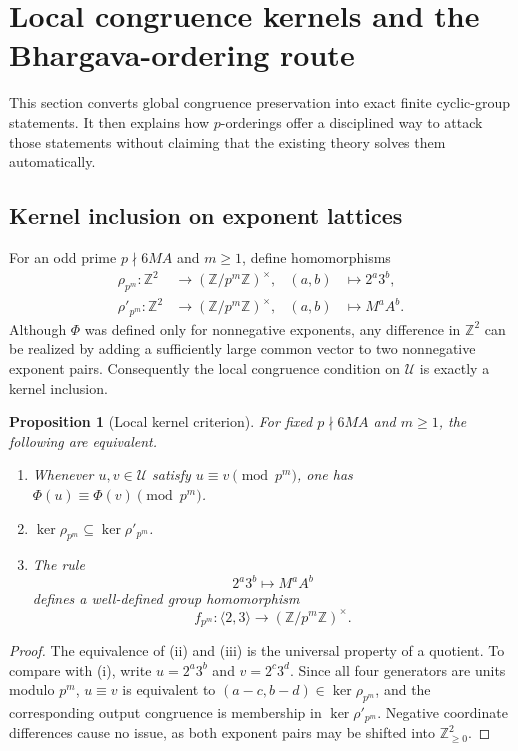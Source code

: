 \documentclass[11pt]{article}
\newtheorem{proposition}[theorem]{Proposition}
\theoremstyle{definition}
\theoremstyle{remark}
\newcommand{\Z}{\mathbb{Z}}
\begin{document}
\section{Local congruence kernels and the Bhargava-ordering route}
\label{sec:bhargava}

This section converts global congruence preservation into exact finite cyclic-group statements.
It then explains how $p$-orderings offer a disciplined way to attack those statements without
claiming that the existing theory solves them automatically.

\subsection{Kernel inclusion on exponent lattices}

For an odd prime $p\nmid6MA$ and $m\ge1$, define homomorphisms
\[
\begin{aligned}
 \rho_{p^m}:\Z^2&\longrightarrow(\Z/p^m\Z)^\times,
 & (a,b)&\longmapsto2^a3^b,\\
 \rho'_{p^m}:\Z^2&\longrightarrow(\Z/p^m\Z)^\times,
 & (a,b)&\longmapsto M^aA^b.
\end{aligned}
\tag{9.1}\label{eq:rhomaps}
\]
Although $\Phi$ was defined only for nonnegative exponents, any difference in $\Z^2$ can be
realized by adding a sufficiently large common vector to two nonnegative exponent pairs.
Consequently the local congruence condition on $\mathcal U$ is exactly a kernel inclusion.

\begin{proposition}[Local kernel criterion]\label{prop:kernelcriterion}
For fixed $p\nmid6MA$ and $m\ge1$, the following are equivalent.
\begin{enumerate}[label=(\roman*),leftmargin=2em]
\item Whenever $u,v\in\mathcal U$ satisfy $u\equiv v\pmod{p^m}$, one has
      $\Phi(u)\equiv\Phi(v)\pmod{p^m}$.
\item $\ker\rho_{p^m}\subseteq\ker\rho'_{p^m}$.
\item The rule
\[
      2^a3^b\longmapsto M^aA^b
\]
defines a well-defined group homomorphism
\[
      f_{p^m}:\langle2,3\rangle\longrightarrow(\Z/p^m\Z)^\times.
\]
\end{enumerate}
\end{proposition}
\begin{proof}
The equivalence of (ii) and (iii) is the universal property of a quotient.  To compare with (i),
write $u=2^a3^b$ and $v=2^c3^d$.  Since all four generators are units modulo $p^m$,
$u\equiv v$ is equivalent to $(a-c,b-d)\in\ker\rho_{p^m}$, and the corresponding output
congruence is membership in $\ker\rho'_{p^m}$.  Negative coordinate differences cause no issue,
as both exponent pairs may be shifted into $\Z_{\ge0}^2$.
\end{proof}
\end{document}
